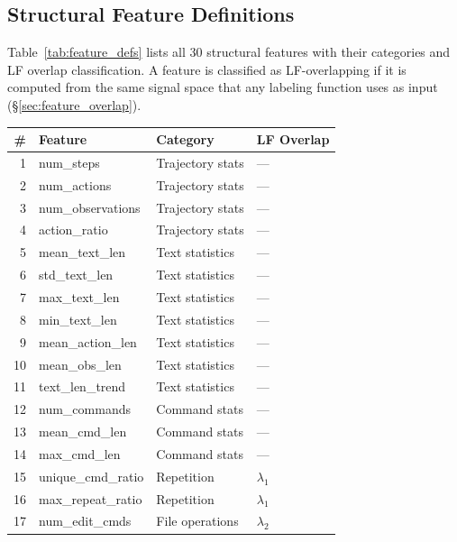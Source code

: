 \subsection{Structural Feature Definitions}
\label{sec:app_features}

Table~\ref{tab:feature_defs} lists all 30 structural features with their categories and LF overlap classification.
A feature is classified as LF-overlapping if it is computed from the same signal space that any labeling function uses as input (\S\ref{sec:feature_overlap}).

\begin{table}[h]
\centering
\small
\begin{tabular}{rlll}
\toprule
\textbf{\#} & \textbf{Feature} & \textbf{Category} & \textbf{LF Overlap} \\
\midrule
1  & num\_steps             & Trajectory stats    & --- \\
2  & num\_actions           & Trajectory stats    & --- \\
3  & num\_observations      & Trajectory stats    & --- \\
4  & action\_ratio          & Trajectory stats    & --- \\
5  & mean\_text\_len        & Text statistics     & --- \\
6  & std\_text\_len         & Text statistics     & --- \\
7  & max\_text\_len         & Text statistics     & --- \\
8  & min\_text\_len         & Text statistics     & --- \\
9  & mean\_action\_len      & Text statistics     & --- \\
10 & mean\_obs\_len         & Text statistics     & --- \\
11 & text\_len\_trend       & Text statistics     & --- \\
12 & num\_commands          & Command stats       & --- \\
13 & mean\_cmd\_len         & Command stats       & --- \\
14 & max\_cmd\_len          & Command stats       & --- \\
15 & unique\_cmd\_ratio     & Repetition          & $\lambda_1$ \\
16 & max\_repeat\_ratio     & Repetition          & $\lambda_1$ \\
17 & num\_edit\_cmds        & File operations     & $\lambda_2$ \\

\end{tabular}
\end{table}
